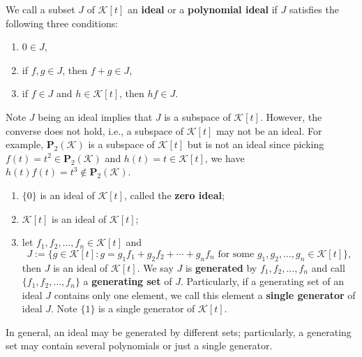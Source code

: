 \documentclass{ctexart}
\begin{document}
    \begin{mydef}
        We call a subset $J$ of $\mathcal K[t]$ an \textbf{ideal} or a \textbf{polynomial ideal} if $J$ satisfies the following three conditions:
        \begin{enumerate}[label=(\arabic*)]
            \item $0 \in J$,
            \item if $f,g \in J$, then $f+g \in J$,
            \item if $f\in J$ and $h\in \mathcal K[t]$, then $hf \in J$.
        \end{enumerate}
    \end{mydef}
    \begin{myrmk}
        Note $J$ being an ideal implies that $J$ is a subspace of $\mathcal K[t]$. However, the converse does not hold, i.e., a subspace of $\mathcal K[t]$ may not be an ideal. For example, $\mathbf{P}_2(\mathcal K)$ is a subspace of $\mathcal K[t]$ but is not an ideal since picking $f(t) = t^2 \in \mathbf{P}_2(\mathcal K)$ and $h(t) = t \in \mathcal K[t]$, we have $h(t) f(t) = t^3 \notin \mathbf{P}_2(\mathcal K)$.
    \end{myrmk}
    \begin{myex}
        \begin{enumerate}[label=(\arabic*)]
            \item $\{ 0 \}$ is an ideal of $\mathcal K[t]$, called the \textbf{zero ideal};
            \item $\mathcal K[t]$ is an ideal of $\mathcal K[t]$;
            \item let $f_1, f_2, \ldots, f_n \in \mathcal K[t]$ and
            $$ J := \{ g \in \mathcal K[t] : g = g_1 f_1 + g_2 f_2 + \cdots + g_n f_n \text{ for some } g_1, g_2, \ldots, g_n \in \mathcal K[t] \}, $$
            then $J$ is an ideal of $\mathcal K[t]$. We say $J$ is \textbf{generated} by $f_1, f_2, \ldots, f_n$ and call $\{ f_1, f_2, \ldots, f_n \}$ a \textbf{generating set} of $J$. Particularly, if a generating set of an ideal $J$ contains only one element, we call this element a \textbf{single generator} of ideal $J$. Note $\{ 1 \}$ is a single generator of $\mathcal K[t]$.
        \end{enumerate}
    \end{myex}
    \begin{myrmk}
        In general, an ideal may be generated by different sets; particularly, a generating set may contain several polynomials or just a single generator.
    \end{myrmk}
\end{document}
